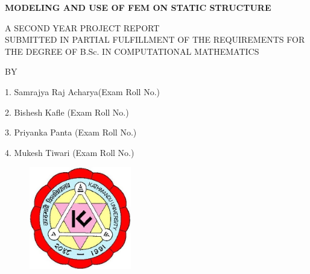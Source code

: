 \documentclass[a4paper,12pt]{report}    %
\begin{document}



{\large
\begin{center}
{{\bf{\color{red}MODELING AND USE OF FEM ON STATIC STRUCTURE}}}\\
\end{center}


\vspace{0.8cm}

{\normalsize
\begin{center}
A SECOND YEAR PROJECT REPORT\\

\vspace{0.5cm}
SUBMITTED IN PARTIAL FULFILLMENT OF THE REQUIREMENTS FOR\\
THE DEGREE OF B.Sc. IN COMPUTATIONAL MATHEMATICS\\

\vspace{1.0cm}

BY
\end{center}
\begin{center}
\begin{itemize}
\begin{center}
\item[1.] Samrajya Raj Acharya(Exam Roll No.)
\item[2.] Bishesh Kafle (Exam Roll No.)
\item[3.] Priyanka Panta (Exam Roll No.)
\item[4.] Mukesh Tiwari (Exam Roll No.)
\end{center}
\end{itemize}

\end{center}


\vspace{1.0cm}

\begin{figure}[htpb]
\centering
\includegraphics[height=4.5cm,width=4.5cm]{photos/kulogo.jpg}
\end{figure}


}}
\end{document}
